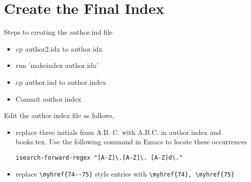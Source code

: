 \documentclass{article}
\begin{document}
\section{Create the Final Index}
Steps to creating the author.ind file
\begin{itemize}
  \item cp author2.idx to author.idx
  \item run 'makeindex author.idx'
  \item cp author.ind to author.index
  \item Commit author.index
\end{itemize}
\noindent
Edit the author.index file as follows,
\begin{itemize}
  \item replace three initials from A.B. C. with A.B.C.
    in author.index and books.tex.  Use the following command in Emacs
    to locate these occurrences
   
   \verb|isearch-forward-regex "[A-Z]\.[A-Z]\. [A-Z]d\."|

 \item replace \verb|\myhref{74--75}| style entries
   with \verb|\myhref{74}, \myhref{75}|
\end{itemize}

\end{document}
